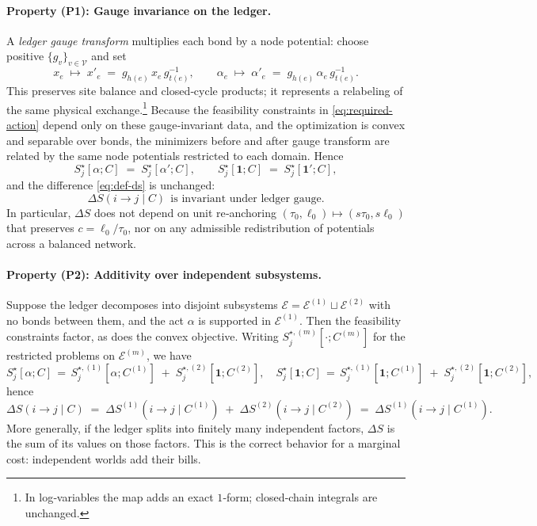 \documentclass[11pt]{article}
\begin{document}
\paragraph{Property (P1): Gauge invariance on the ledger.}
A \emph{ledger gauge transform} multiplies each bond by a node potential: choose positive $\{g_v\}_{v\in\mathcal V}$ and set
\[
x_e\;\mapsto\;x'_e\;=\;g_{h(e)}\,x_e\,g^{-1}_{t(e)}\!,
\qquad
\alpha_e\;\mapsto\;\alpha'_e\;=\;g_{h(e)}\,\alpha_e\,g^{-1}_{t(e)}.
\]
This preserves site balance and closed‑cycle products; it represents a relabeling of the same physical exchange.\footnote{In log‑variables the map adds an exact $1$‑form; closed‑chain integrals are unchanged.} Because the feasibility constraints in \eqref{eq:required-action} depend only on these gauge‑invariant data, and the optimization is convex and separable over bonds, the minimizers before and after gauge transform are related by the same node potentials restricted to each domain. Hence
\[
S_j^\star[\alpha;C]\;=\;S_j^\star[\alpha';C],\qquad
S_j^\star[\mathbf 1;C]\;=\;S_j^\star[\mathbf 1';C],
\]
and the difference \eqref{eq:def-ds} is unchanged:
\begin{equation}
\Delta S(i\!\to\! j\mid C)\ \ \text{is invariant under ledger gauge.}
\label{eq:gauge-invariance}
\end{equation}
In particular, $\Delta S$ does not depend on unit re‑anchoring $(\tau_0,\ell_0)\mapsto(s\tau_0,s\ell_0)$ that preserves $c=\ell_0/\tau_0$, nor on any admissible redistribution of potentials across a balanced network.

\paragraph{Property (P2): Additivity over independent subsystems.}
Suppose the ledger decomposes into disjoint subsystems $\mathcal E=\mathcal E^{(1)}\sqcup \mathcal E^{(2)}$ with no bonds between them, and the act $\alpha$ is supported in $\mathcal E^{(1)}$. Then the feasibility constraints factor, as does the convex objective. Writing $S_{j}^{\star, (m)}[\cdot;C^{(m)}]$ for the restricted problems on $\mathcal E^{(m)}$, we have
\[
S_j^\star[\alpha;C]
\,=\,S_{j}^{\star,(1)}[\alpha;C^{(1)}]\;+\;S_{j}^{\star,(2)}[\mathbf 1;C^{(2)}],
\quad
S_j^\star[\mathbf 1;C]
\,=\,S_{j}^{\star,(1)}[\mathbf 1;C^{(1)}]\;+\;S_{j}^{\star,(2)}[\mathbf 1;C^{(2)}],
\]
hence
\begin{equation}
\Delta S(i\!\to\! j\mid C)
\;=\;
\Delta S^{(1)}(i\!\to\! j\mid C^{(1)})\;+\;\Delta S^{(2)}(i\!\to\! j\mid C^{(2)})
\;=\;
\Delta S^{(1)}(i\!\to\! j\mid C^{(1)}).
\label{eq:additivity}
\end{equation}
More generally, if the ledger splits into finitely many independent factors, $\Delta S$ is the sum of its values on those factors. This is the correct behavior for a marginal cost: independent worlds add their bills.
\end{document}
